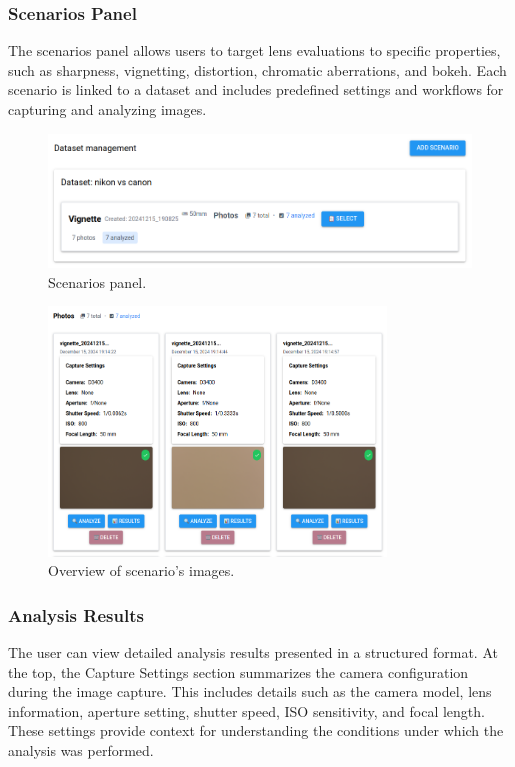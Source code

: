 \subsubsection{Scenarios Panel}
The scenarios panel allows users to target lens evaluations to specific properties, such as sharpness, vignetting, distortion, chromatic aberrations, and bokeh. Each scenario is linked to a dataset and includes predefined settings and workflows for capturing and analyzing images.

\begin{figure}[hbt]
\centering
\includegraphics[width=1\textwidth]{Images/scenarios_panel.png}
\caption{Scenarios panel.}
\label{fig:ui_scenarios}
\end{figure}

\begin{figure}[hbt]
\centering
\includegraphics[width=0.8\textwidth]{Images/scenario_photos.png}
\caption{Overview of scenario's images.}
\label{fig:ui_scenario_images}
\end{figure}

\subsubsection{Analysis Results}

The user can view detailed analysis results presented in a structured format. At the top, the Capture Settings section summarizes the camera configuration during the image capture. This includes details such as the camera model, lens information, aperture setting, shutter speed, ISO sensitivity, and focal length. These settings provide context for understanding the conditions under which the analysis was performed.

